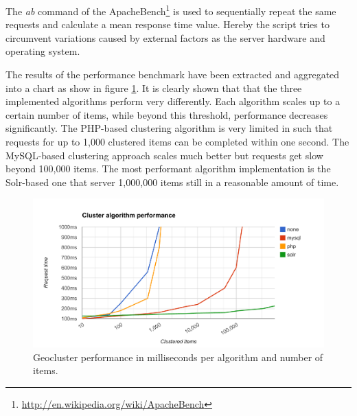 The \textit{ab} command of the ApacheBench\footnote{\url{http://en.wikipedia.org/wiki/ApacheBench}} is used to sequentially repeat the same requests and calculate a mean response time value. Hereby the script tries to circumvent variations caused by external factors as the server hardware and operating system.

The results of the performance benchmark have been extracted and aggregated into a chart as show in figure \ref{fig:algorithm-performance}. It is clearly shown that that the three implemented algorithms perform very differently. Each algorithm scales up to a certain number of items, while beyond this threshold, performance decreases significantly. The PHP-based clustering algorithm is very limited in such that requests for up to 1,000 clustered items can be completed within one second. The MySQL-based clustering approach scales much better but requests get slow beyond 100,000 items. The most performant algorithm implementation is the Solr-based one that server 1,000,000 items still in a reasonable amount of time. 

\begin{figure}[h]
  \begin{center}
    \hspace*{-1.5cm}\includegraphics[width=1.3\textwidth]{figures/geocluster_algorithm_performance.pdf}
    \caption{Geocluster performance in milliseconds per algorithm and number of items.}
    \label{fig:algorithm-performance}
  \end{center}
\end{figure}

